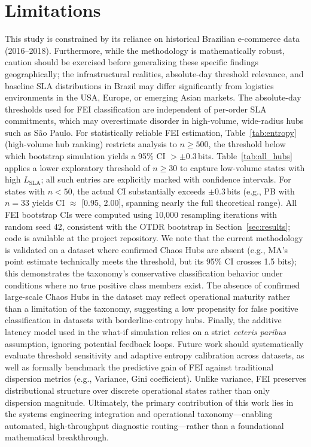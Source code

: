 \documentclass[conference]{IEEEtran}
\begin{document}
\section{Limitations}
This study is constrained by its reliance on historical Brazilian e-commerce data (2016--2018). Furthermore, while the methodology is mathematically robust, caution should be exercised before generalizing these specific findings geographically; the infrastructural realities, absolute-day threshold relevance, and baseline SLA distributions in Brazil may differ significantly from logistics environments in the USA, Europe, or emerging Asian markets. The absolute-day thresholds used for FEI classification are independent of per-order SLA commitments, which may overestimate disorder in high-volume, wide-radius hubs such as São Paulo. For statistically reliable FEI estimation, Table~\ref{tab:entropy} (high-volume hub ranking) restricts analysis to $n \ge 500$, the threshold below which bootstrap simulation yields a 95\% CI $> \pm 0.3$\,bits. Table~\ref{tab:all_hubs} applies a lower exploratory threshold of $n \ge 30$ to capture low-volume states with high $L_{\text{SLA}}$; all such entries are explicitly marked with confidence intervals. For states with $n < 50$, the actual CI substantially exceeds $\pm 0.3$\,bits (e.g., PB with $n=33$ yields CI $\approx$ [0.95, 2.00], spanning nearly the full theoretical range). All FEI bootstrap CIs were computed using 10,000 resampling iterations with random seed 42, consistent with the OTDR bootstrap in Section~\ref{sec:results}; code is available at the project repository. We note that the current methodology is validated on a dataset where confirmed Chaos Hubs are absent (e.g., MA's point estimate technically meets the threshold, but its 95\% CI crosses 1.5 bits); this demonstrates the taxonomy's conservative classification behavior under conditions where no true positive class members exist. The absence of confirmed large-scale Chaos Hubs in the dataset may reflect operational maturity rather than a limitation of the taxonomy, suggesting a low propensity for false positive classification in datasets with borderline-entropy hubs. Finally, the additive latency model used in the what-if simulation relies on a strict \textit{ceteris paribus} assumption, ignoring potential feedback loops. Future work should systematically evaluate threshold sensitivity and adaptive entropy calibration across datasets, as well as formally benchmark the predictive gain of FEI against traditional dispersion metrics (e.g., Variance, Gini coefficient). Unlike variance, FEI preserves distributional structure over discrete operational states rather than only dispersion magnitude. Ultimately, the primary contribution of this work lies in the systems engineering integration and operational taxonomy---enabling automated, high-throughput diagnostic routing---rather than a foundational mathematical breakthrough.
\end{document}
